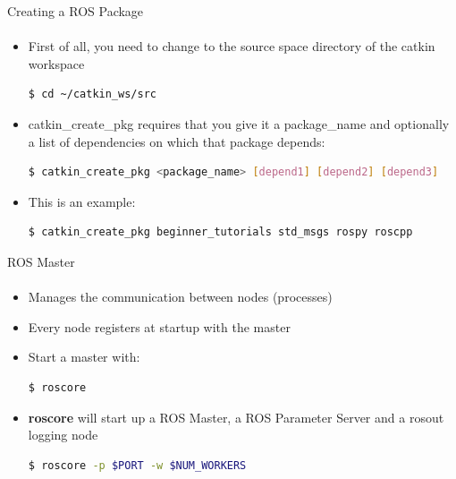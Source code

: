 \documentclass[aspectratio=169]{beamer}
\begin{document}
\begin{frame}[fragile]{Creating a ROS Package}
	\framesubtitle{ }
    \begin{itemize}
        \item First of all, you need to change to the source space directory of the catkin workspace
		\begin{lstlisting}[language=bash]
	$ cd ~/catkin_ws/src
		\end{lstlisting}
		\item catkin\_create\_pkg requires that you give it a package\_name and optionally a list of dependencies on which that package depends:
		\begin{lstlisting}[language=bash]
	$ catkin_create_pkg <package_name> [depend1] [depend2] [depend3]
		\end{lstlisting}
		\item This is an example:
		\begin{lstlisting}[language=bash]
			$ catkin_create_pkg beginner_tutorials std_msgs rospy roscpp
		\end{lstlisting}

	\end{itemize}
\end{frame}


\begin{frame}[fragile]{ROS Master}
	\framesubtitle{ }
	\begin{minipage}{0.6\textwidth}
    \begin{itemize}
        \item Manages the communication between nodes (processes)
        \item Every node registers at startup with the master
    \end{itemize}
	
	\vspace{0.3in}

	\begin{itemize}
		\item Start a master with:

		\begin{lstlisting}[language=bash]
	$ roscore
		\end{lstlisting}

		\item \textbf{roscore} will start up a ROS Master, a ROS Parameter Server and a rosout logging node
		
		\begin{lstlisting}[language=bash]
	$ roscore -p $PORT -w $NUM_WORKERS
		\end{lstlisting}
		\end{itemize}

\end{minipage}
\begin{minipage}{0.4\textwidth}
	
\end{minipage}
\end{frame}
\end{document}
